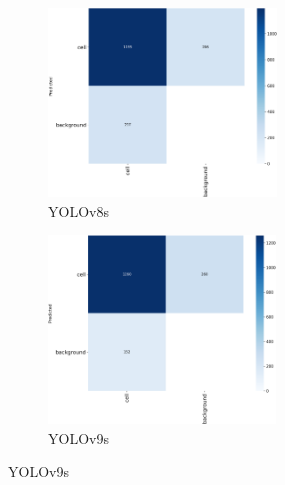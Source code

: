 \documentclass[12pt,a4paper,onecolumn,oneside]{report}
\begin{document}
\begin{figure}[H]
  \centering
  \vspace{-0.3cm}
  \begin{subfigure}[b]{0.45\textwidth}
    \centering
    \includegraphics[height=5cm]{figuras/resultados experimentacion/yolov8s/test/confusion_matrix.png}
    \vspace{-0.3cm}
    \caption{\footnotesize YOLOv8s}
    \label{fig:confusion_yolov8s_test}
  \end{subfigure}
  \hfill
  \begin{subfigure}[b]{0.45\textwidth}
    \centering
    \includegraphics[height=5cm]{figuras/resultados experimentacion/yolov9s/test/confusion_matrix.png}
    \vspace{-0.3cm}
    \caption{\footnotesize YOLOv9s}
    \label{fig:confusion_yolov9s_test}
  \end{subfigure}
  

\end{figure}
\end{document}
